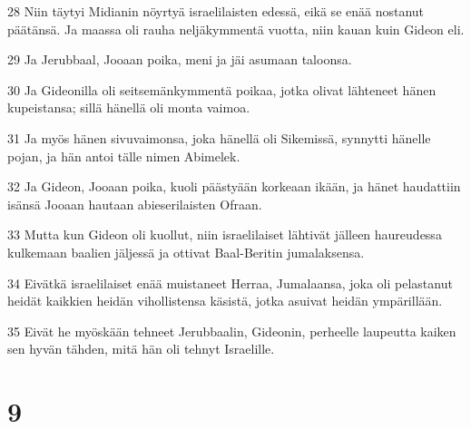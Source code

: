 \par 28 Niin täytyi Midianin nöyrtyä israelilaisten edessä, eikä se enää nostanut päätänsä. Ja maassa oli rauha neljäkymmentä vuotta, niin kauan kuin Gideon eli.
\par 29 Ja Jerubbaal, Jooaan poika, meni ja jäi asumaan taloonsa.
\par 30 Ja Gideonilla oli seitsemänkymmentä poikaa, jotka olivat lähteneet hänen kupeistansa; sillä hänellä oli monta vaimoa.
\par 31 Ja myös hänen sivuvaimonsa, joka hänellä oli Sikemissä, synnytti hänelle pojan, ja hän antoi tälle nimen Abimelek.
\par 32 Ja Gideon, Jooaan poika, kuoli päästyään korkeaan ikään, ja hänet haudattiin isänsä Jooaan hautaan abieserilaisten Ofraan.
\par 33 Mutta kun Gideon oli kuollut, niin israelilaiset lähtivät jälleen haureudessa kulkemaan baalien jäljessä ja ottivat Baal-Beritin jumalaksensa.
\par 34 Eivätkä israelilaiset enää muistaneet Herraa, Jumalaansa, joka oli pelastanut heidät kaikkien heidän vihollistensa käsistä, jotka asuivat heidän ympärillään.
\par 35 Eivät he myöskään tehneet Jerubbaalin, Gideonin, perheelle laupeutta kaiken sen hyvän tähden, mitä hän oli tehnyt Israelille.

\chapter{9}


